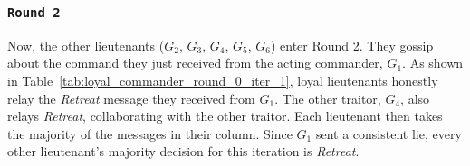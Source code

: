 \documentclass[11pt]{article}
\newcommand{\gen}[1]{\ensuremath{G_{#1}}}
\begin{document}
\subsubsection*{\texttt{\large Round 2}}
\justifying
Now, the other lieutenants ($\gen{2}$, $\gen{3}$, $\gen{4}$, $\gen{5}$, $\gen{6}$) enter Round 2. They gossip about the command they just received from the acting commander, $\gen{1}$. As shown in Table~\ref{tab:loyal_commander_round_0_iter_1}, loyal lieutenants honestly relay the \textit{Retreat} message they received from $\gen{1}$. The other traitor, $\gen{4}$, also relays \textit{Retreat}, collaborating with the other traitor. Each lieutenant then takes the majority of the messages in their column. Since $\gen{1}$ sent a consistent lie, every other lieutenant's majority decision for this iteration is \textit{Retreat}.
\end{document}
